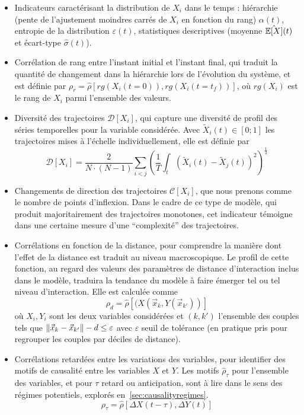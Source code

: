 {\begin{itemize}
\[\]
\end{itemize}
}{
\begin{itemize}
  \item Indicateurs caractérisant la distribution de $X_i$ dans le temps : hiérarchie (pente de l'ajustement moindres carrés de $X_i$ en fonction du rang) $\alpha (t)$, entropie de la distribution $\varepsilon (t)$, statistiques descriptives (moyenne $\hat{\operatorname{\mathbb{E}}\!\left[X\right]} (t)$ et écart-type $\hat{\sigma} (t)$).
  \item Corrélation de rang entre l'instant initial et l'instant final, qui traduit la quantité de changement dans la hiérarchie lors de l'évolution du système, et est définie par $\rho_r = \hat{\rho}\left[rg(X_i(t=0)),rg(X_i(t=t_f))\right]$, où $rg(X_i)$ est le rang de $X_i$ parmi l'ensemble des valeurs.
  \item Diversité des trajectoires $\mathcal{D}\left[X_i\right]$, qui capture une diversité de profil des séries temporelles pour la variable considérée. Avec $\tilde{X}_i(t)\in \left[0;1\right]$ les trajectoires mises à l'échelle individuellement, elle est définie par
\[
\mathcal{D}\left[X_i\right] = \frac{2}{N\cdot(N-1)}\sum_{i<j} \left(\frac{1}{T}\int_{t} \left(\tilde{X}_i(t) - \tilde{X}_j(t)\right)^2 \right)^{\frac{1}{2}}
\]
\item Changements de direction des trajectoires $\mathcal{C}\left[X_i\right]$, que nous prenons comme le nombre de points d'inflexion. Dans le cadre de ce type de modèle, qui produit majoritairement des trajectoires monotones, cet indicateur témoigne dans une certaine mesure d'une ``complexité'' des trajectoires.
\item Corrélations en fonction de la distance, pour comprendre la manière dont l'effet de la distance est traduit au niveau macroscopique. Le profil de cette fonction, au regard des valeurs des paramètres de distance d'interaction inclus dans le modèle, traduira la tendance du modèle à faire émerger tel ou tel niveau d'interaction. Elle est calculée comme
\[
\rho_d = \hat{\rho}\left[(X(\vec{x}_k,Y(\vec{x}_{k'}))\right]
\]
où $X_i, Y_i$ sont les deux variables considérées et $(k,k')$ l'ensemble des couples tels que $\| \vec{x}_k-\vec{x}_{k'} \| - d \leq \varepsilon$ avec $\varepsilon$ seuil de tolérance (en pratique pris pour regrouper les couples par déciles de distance).
\item Corrélations retardées entre les variations des variables, pour identifier des motifs de causalité entre les variables $X$ et $Y$. Les motifs $\hat{\rho}_{\tau}$ pour l'ensemble des variables, et pour $\tau$ retard ou anticipation, sont à lire dans le sens des régimes potentiels, explorés en~\ref{sec:causalityregimes}.
\[
\rho_{\tau} = \hat{\rho}\left[\Delta X(t-\tau),\Delta Y(t)\right]
\]
\end{itemize}
}

